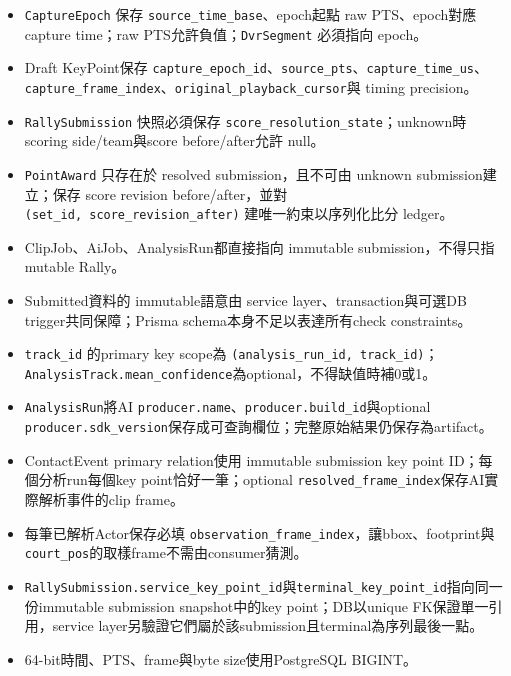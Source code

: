 \documentclass[
  9pt,
  a4paper,
]{article}
\providecommand{\tightlist}{%
  \setlength{\itemsep}{0pt}\setlength{\parskip}{0pt}}
\begin{document}
\begin{itemize}
\tightlist
\item
  \texttt{CaptureEpoch} 保存 \texttt{source\_\allowbreak{}time\_\allowbreak{}base}、epoch起點 raw
  PTS、epoch對應 capture time；raw PTS允許負值；\texttt{DvrSegment}
  必須指向 epoch。
\item
  Draft KeyPoint保存
  \texttt{capture\_\allowbreak{}epoch\_\allowbreak{}id}、\texttt{source\_\allowbreak{}pts}、\texttt{capture\_\allowbreak{}time\_\allowbreak{}us}、\texttt{capture\_\allowbreak{}frame\_\allowbreak{}index}、\texttt{original\_\allowbreak{}playback\_\allowbreak{}cursor}與
  timing precision。
\item
  \texttt{RallySubmission} 快照必須保存
  \texttt{score\_\allowbreak{}resolution\_\allowbreak{}state}；unknown時 scoring side/team與score
  before/after允許 null。
\item
  \texttt{PointAward} 只存在於 resolved submission，且不可由 unknown
  submission建立；保存 score revision before/after，並對
  \texttt{(set\_\allowbreak{}id,\ score\_\allowbreak{}revision\_\allowbreak{}after)} 建唯一約束以序列化比分
  ledger。
\item
  ClipJob、AiJob、AnalysisRun都直接指向 immutable submission，不得只指
  mutable Rally。
\item
  Submitted資料的 immutable語意由 service layer、transaction與可選DB
  trigger共同保障；Prisma schema本身不足以表達所有check constraints。
\item
  \texttt{track\_\allowbreak{}id} 的primary key scope為
  \texttt{(analysis\_\allowbreak{}run\_\allowbreak{}id,\ track\_\allowbreak{}id)}；\texttt{AnalysisTrack.mean\_\allowbreak{}confidence}為optional，不得缺值時補0或1。
\item
  \texttt{AnalysisRun}將AI
  \texttt{producer.name}、\texttt{producer.build\_\allowbreak{}id}與optional
  \texttt{producer.sdk\_\allowbreak{}version}保存成可查詢欄位；完整原始結果仍保存為artifact。
\item
  ContactEvent primary relation使用 immutable submission key point
  ID；每個分析run每個key point恰好一筆；optional
  \texttt{resolved\_\allowbreak{}frame\_\allowbreak{}index}保存AI實際解析事件的clip frame。
\item
  每筆已解析Actor保存必填
  \texttt{observation\_\allowbreak{}frame\_\allowbreak{}index}，讓bbox、footprint與\texttt{court\_\allowbreak{}pos}的取樣frame不需由consumer猜測。
\item
  \texttt{RallySubmission.service\_\allowbreak{}key\_\allowbreak{}point\_\allowbreak{}id}與\texttt{terminal\_\allowbreak{}key\_\allowbreak{}point\_\allowbreak{}id}指向同一份immutable
  submission snapshot中的key point；DB以unique FK保證單一引用，service
  layer另驗證它們屬於該submission且terminal為序列最後一點。
\item
  64-bit時間、PTS、frame與byte size使用PostgreSQL BIGINT。
\end{itemize}
\end{document}
